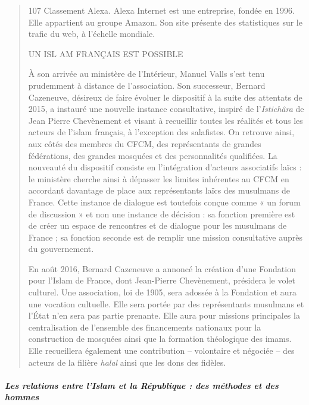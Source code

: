 \begin{quote}
107 Classement Alexa. Alexa Internet est une entreprise, fondée en 1996.
Elle appartient au groupe Amazon. Son site présente des statistiques sur
le trafic du web, à l'échelle mondiale.

UN ISL AM FRANÇAIS EST POSSIBLE

À son arrivée au ministère de l'Intérieur, Manuel Valls s'est tenu
prudemment à distance de l'association. Son successeur, Bernard
Cazeneuve, désireux de faire évoluer le dispositif à la suite des
attentats de 2015, a instauré une nouvelle instance consultative,
inspiré de l'\emph{Istichâra} de Jean Pierre Chevènement et visant à
recueillir toutes les réalités et tous les acteurs de l'islam français,
à l'exception des salafistes. On retrouve ainsi, aux côtés des membres
du CFCM, des représentants de grandes fédérations, des grandes mosquées
et des personnalités qualifiées. La nouveauté du dispositif consiste en
l'intégration d'acteurs associatifs laïcs : le ministère cherche ainsi à
dépasser les limites inhérentes au CFCM en accordant davantage de place
aux représentants laïcs des musulmans de France. Cette instance de
dialogue est toutefois conçue comme « un forum de discussion » et non
une instance de décision : sa fonction première est de créer un espace
de rencontres et de dialogue pour les musulmans de France ; sa fonction
seconde est de remplir une mission consultative auprès du gouvernement.

En août 2016, Bernard Cazeneuve a annoncé la création d'une Fondation
pour l'Islam de France, dont Jean-Pierre Chevènement, présidera le volet
culturel. Une association, loi de 1905, sera adossée à la Fondation et
aura une vocation cultuelle. Elle sera portée par des représentants
musulmans et l'État n'en sera pas partie prenante. Elle aura pour
missions principales la centralisation de l'ensemble des financements
nationaux pour la construction de mosquées ainsi que la formation
théologique des imams. Elle recueillera également une contribution --
volontaire et négociée -- des acteurs de la filière \emph{halal} ainsi
que les dons des fidèles.
\end{quote}

\hypertarget{les-relations-entre-lislam-et-la-ruxe9publique-des-muxe9thodes-et-des-hommes}{%
\subparagraph{Les relations entre l'Islam et la République : des
méthodes et des
hommes}\label{les-relations-entre-lislam-et-la-ruxe9publique-des-muxe9thodes-et-des-hommes}}


